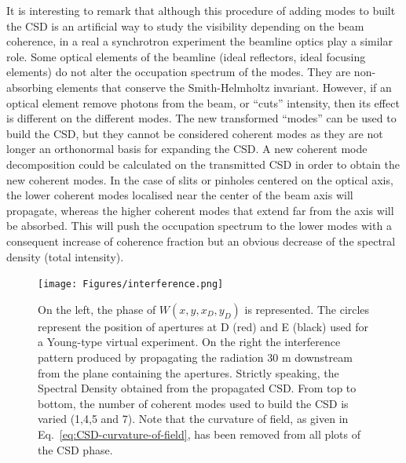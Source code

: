 \documentclass[%
 reprint,
 amsmath,amssymb,
 aps,
]{revtex4-1}
\begin{document}
It is interesting to remark that although this procedure of adding modes to built the CSD is an artificial way to study the visibility depending on the beam coherence, in a real a synchrotron experiment the beamline optics play a similar role. Some optical elements of the beamline (ideal reflectors, ideal focusing elements) do not alter the occupation spectrum of the modes. They are non-absorbing elements that conserve the Smith-Helmholtz invariant. However, if an optical element remove photons from the beam, or ``cuts'' intensity, then its effect is different on the different modes. The new transformed ``modes'' can be used to build the CSD, but they cannot be considered coherent modes as they are not longer an orthonormal basis for expanding the CSD. A new coherent mode decomposition could be calculated on the transmitted CSD in order to obtain the new coherent modes. In the case of slits or pinholes centered on the optical axis, the lower coherent modes localised near the center of the beam axis will propagate, whereas the higher coherent modes that extend far from the axis will be absorbed. This will push the occupation spectrum to the lower modes with a consequent increase of coherence fraction but an obvious decrease of the spectral density (total intensity).     

\begin{figure}
\texttt{[image: Figures/interference.png]}
\caption{On the left, the phase of $W(x,y,x_{D},y_{D})$ is represented. The circles represent the position of apertures at D (red) and E (black) used for a Young-type virtual experiment. On the right the interference pattern produced by propagating the radiation 30 m downstream from the plane containing the apertures. Strictly speaking, the Spectral Density obtained from the propagated CSD. From top to bottom, the number of coherent modes used to build the CSD is varied (1,4,5 and 7). Note that the curvature of field, as given in Eq.~\ref{eq:CSD-curvature-of-field}, has been removed from all plots of the CSD phase.}
%
%
%
%
%
%
\label{young}
\end{figure}
\end{document}
